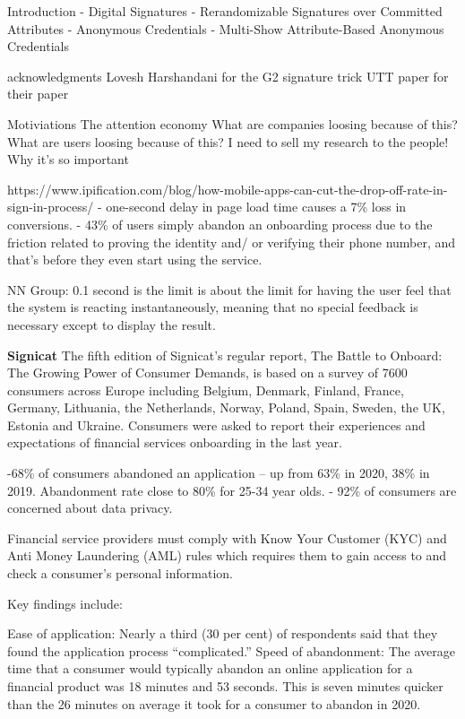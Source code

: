 Introduction
- Digital Signatures
- Rerandomizable Signatures over Committed Attributes
- Anonymous Credentials
- Multi-Show Attribute-Based Anonymous Credentials


acknowledgments 
Lovesh Harshandani for the G2 signature trick
UTT paper for their paper



Motiviations
The attention economy
What are companies loosing because of this?
What are users loosing because of this?
I need to sell my research to the people! Why it's so important

https://www.ipification.com/blog/how-mobile-apps-can-cut-the-drop-off-rate-in-sign-in-process/
- one-second delay in page load time causes a 7\% loss in conversions.
- 43\% of users simply abandon an onboarding process due to the friction related to proving the identity and/ or verifying their phone number, and that’s before they even start using the service.



NN Group:
0.1 second is the limit  is about the limit for having the user feel that the system is reacting instantaneously, meaning that no special feedback is necessary except to display the result.




\textbf{Signicat}
The fifth edition of Signicat’s regular report, The Battle to Onboard: The Growing Power of Consumer Demands, is based on a survey of 7600 consumers across Europe including Belgium, Denmark, Finland, France, Germany, Lithuania, the Netherlands, Norway, Poland, Spain, Sweden, the UK, Estonia and Ukraine. Consumers were asked to report their experiences and expectations of financial services onboarding in the last year.


\cite{signicat_battle_2022}
-68\% of consumers abandoned an application – up from 63\% in 2020, 38\% in 2019. Abandonment rate close to 80\% for 25-34 year olds.
- 92\% of consumers are concerned about data privacy.

Financial service providers must comply with Know Your Customer (KYC) and Anti Money Laundering (AML) rules which requires them to gain access to and check a consumer’s personal information.

Key findings include:

Ease of application: Nearly a third (30 per cent) of respondents said that they found the application process “complicated.”
Speed of abandonment: The average time that a consumer would typically abandon an online application for a financial product was 18 minutes and 53 seconds. This is seven minutes quicker than the 26 minutes on average it took for a consumer to abandon in 2020.

